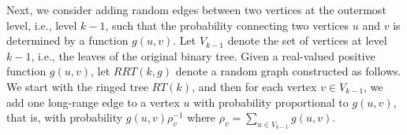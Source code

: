 \documentclass[11pt]{article}
\begin{document}




Next, we consider adding random edges between two vertices at the outermost
level, i.e., level $k-1$, such that the probability connecting two vertices 
	$u$ and $v$ is
	determined by a function $g(u,v)$.
Let $V_{k-1}$ denote the set of vertices at level $k-1$, i.e., the
	leaves of the original binary tree.
Given a real-valued positive function $g(u,v)$, 
	let $RRT(k,g)$ denote a random graph constructed as follows.
We start with the ringed tree $RT(k)$, and then for each 
	vertex $v\in V_{k-1}$, we add one long-range edge to a vertex 
	$u$ with
	probability proportional to $g(u,v)$, that is,
	with probability $g(u,v)\rho_v^{-1}$ where 
	$\rho_v = \sum_{u\in V_{k-1}} g(u,v)$.
\end{document}
